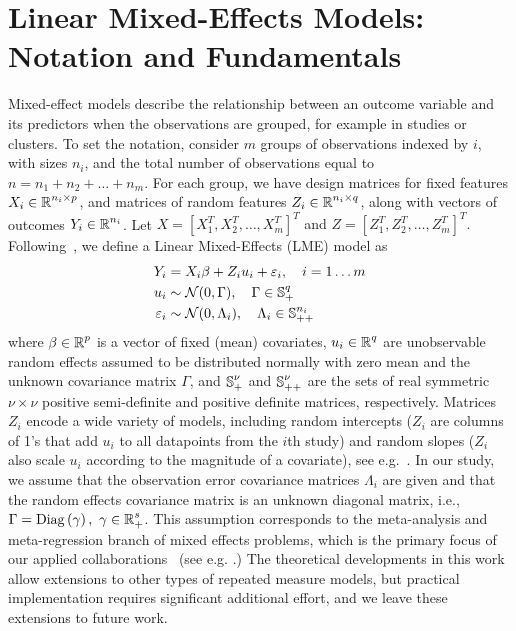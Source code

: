 \section{Linear Mixed-Effects Models: Notation and Fundamentals}\label{sec:LMEM}
Mixed-effect models describe the relationship between an outcome variable and its predictors when the observations are grouped, for example in studies or clusters.  To set the notation, consider $m$ groups of observations indexed by $i$, with sizes $n_i$, and the total number of observations equal to $n = n_1 + n_2 + \dots + n_m$. For each group, we have design matrices for fixed features $X_i \in \operatorname{\mathbb{R}}^{n_i \times p}$,  and matrices of random features $Z_i \in \operatorname{\mathbb{R}}^{n_i \times q}$, along with vectors of outcomes $Y_i \in \operatorname{\mathbb{R}}^{n_i}$. 
Let 
{$X = [X_1^T, X_2^T, \dots, X_m^T]^T$ and $Z = [Z_1^T, Z_2^T, \dots, Z_m^T]^T$.} 
Following~\cite{Patterson1971, Pinheiro2000}, we define a Linear Mixed-Effects (LME) model as
\begin{equation}
\begin{aligned}
	Y_i & = X_i\beta + Z_iu_i + \varepsilon_i, \quad i = 1 \dots m \\
	u_i & \sim \operatorname{\mathcal{N}}(0, \Gamma),\quad \Gamma \in \operatorname{\mathbb{S}}_{+}^{q} \\
	\varepsilon_i & \sim \operatorname{\mathcal{N}}(0, \Lambda_i), \quad \Lambda_i \in \operatorname{\mathbb{S}}_{++}^{n_i}
	\end{aligned}
	\label{eq:lme_setup}
\end{equation}
 where $\beta \in \operatorname{\mathbb{R}}^p$ is a vector of fixed (mean) covariates, 
 $u_i \in \operatorname{\mathbb{R}}^{q}$ are unobservable random effects assumed to be distributed normally with zero mean and the unknown covariance matrix $\Gamma$, and $\operatorname{\mathbb{S}}_{+}^{\nu}$ 
 and $\operatorname{\mathbb{S}}_{++}^{\nu}$ are the sets of
 real symmetric $\nu\times \nu$ positive semi-definite
 and positive definite matrices, respectively. 
Matrices $Z_i$ encode a wide variety of models, including
random intercepts ($Z_i$ are columns of 1's that add $u_i$ to all datapoints from the $i$th study)
and random slopes ($Z_i$ also scale $u_i$ according to the magnitude of a covariate), see e.g.~\cite{pinheiro2006mixed}. 
In our study, we assume that the observation error covariance matrices 
$\Lambda_i$ are given and that the random effects covariance matrix 
is an unknown diagonal matrix, i.e., $\Gamma = \mathrm{Diag}\left(\gamma\right), \ \gamma \in \operatorname{\mathbb{R}}^s_+$.
This assumption corresponds to the meta-analysis and meta-regression branch of mixed effects problems, 
which is the primary focus of our applied collaborations~ (see e.g. \cite{zheng2022burden,lescinsky2022health,razo2022effects,stanaway2022health,dai2022health}.)
The theoretical developments in this work allow extensions to other types of repeated measure models, 
but practical implementation requires significant additional effort, and we leave these extensions to future work.  

